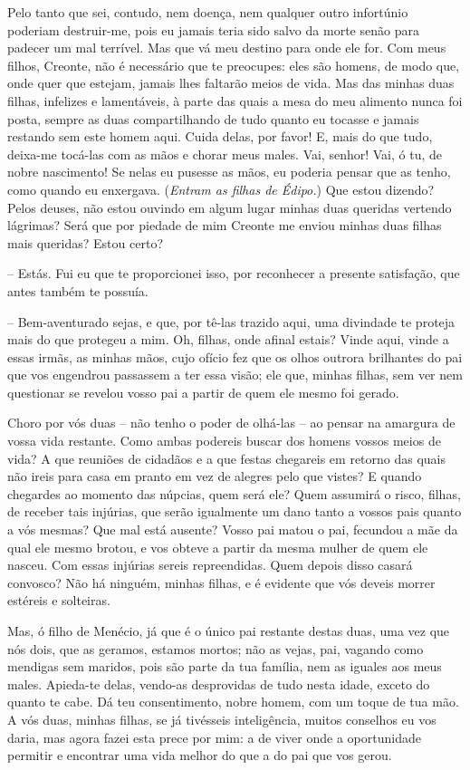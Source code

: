 Pelo tanto que sei, contudo, nem doença, nem qualquer outro infortúnio
poderiam destruir-me, pois eu jamais teria sido salvo da morte senão
para padecer um mal terrível. Mas que vá meu destino para onde ele for.
Com meus filhos, Creonte, não  é necessário que te preocupes: eles
são homens, de modo que, onde quer que estejam, jamais lhes faltarão
meios de vida. Mas das minhas duas filhas, infelizes e lamentáveis, à
parte das quais a mesa do meu alimento nunca foi posta, sempre as duas
compartilhando de tudo quanto eu tocasse e jamais restando sem este
homem aqui. Cuida delas, por favor! E, mais do que tudo, deixa-me
tocá-las com as mãos e chorar meus males. Vai, senhor! Vai, ó tu, de
nobre nascimento! Se nelas eu pusesse as mãos,  eu poderia pensar
que as tenho, como quando eu enxergava. (\emph{Entram as filhas de
Édipo.}) Que estou dizendo? Pelos deuses, não estou ouvindo em algum
lugar minhas duas queridas vertendo lágrimas? Será que por piedade de
mim Creonte me enviou minhas duas filhas mais queridas? Estou certo?

 --   Estás. Fui eu que te proporcionei isso, por reconhecer a presente
satisfação, que antes também te possuía.

 --   Bem-aventurado sejas, e que, por tê-las trazido aqui, uma divindade te
proteja  mais do que protegeu a mim. Oh, filhas, onde afinal
estais? Vinde aqui, vinde a essas irmãs, as minhas mãos, cujo ofício fez
que os olhos outrora brilhantes do pai que vos engendrou passassem a ter
essa visão; ele que, minhas filhas, sem ver nem questionar se revelou
vosso pai a partir de quem ele mesmo foi gerado.

Choro por vós duas -- não tenho o poder de olhá-las -- ao pensar na
amargura de vossa vida restante. Como ambas podereis buscar dos homens
vossos meios de vida? A  que reuniões de cidadãos e a que festas
chegareis em retorno das quais não ireis para casa em pranto em vez de
alegres pelo que vistes? E quando chegardes ao momento das núpcias, quem
será ele? Quem assumirá o risco, filhas, de receber tais injúrias, que
serão igualmente um dano tanto a vossos pais quanto a vós mesmas? Que
mal está ausente? Vosso pai matou o pai, fecundou a mãe da qual ele
mesmo brotou, e vos obteve a partir da mesma mulher de quem ele nasceu.
Com essas injúrias sereis  repreendidas. Quem depois disso casará
convosco? Não há ninguém, minhas filhas, e é evidente que vós deveis
morrer estéreis e solteiras.

Mas, ó filho de Menécio, já que é o único pai restante destas duas, uma
vez que nós dois, que as geramos, estamos mortos; não as vejas, pai,
vagando como mendigas sem maridos, pois são parte da tua família, nem as
iguales aos meus males. Apieda-te delas, vendo-as desprovidas de tudo
nesta idade, exceto do quanto te cabe. Dá teu  consentimento,
nobre homem, com um toque de tua mão. A vós duas, minhas filhas, se já
tivésseis inteligência, muitos conselhos eu vos daria, mas agora fazei
esta prece por mim: a de viver onde a oportunidade permitir e encontrar
uma vida melhor do que a do pai que vos gerou.


